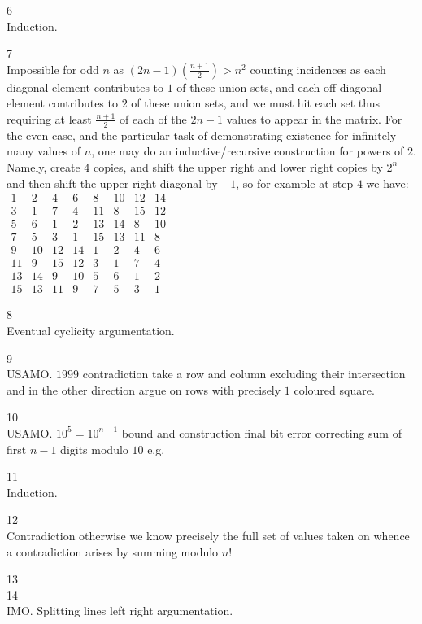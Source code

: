 6 \\
Induction.

7 \\
Impossible for odd $n$ as $(2n-1)\left(\frac{n+1}{2}\right) > n^2$ counting incidences as each diagonal element contributes to $1$ of these union sets, and each off-diagonal element contributes to $2$ of these union sets, and we must hit each set thus requiring at least $\frac{n+1}{2}$ of each of the $2n-1$ values to appear in the matrix. For the even case, and the particular task of demonstrating existence for infinitely many values of $n$, one may do an inductive/recursive construction for powers of $2$. Namely, create $4$ copies, and shift the upper right and lower right copies by $2^{n}$ and then shift the upper right diagonal by $-1$, so for example at step $4$ we have: \\
$
\begin{matrix}
1 & 2 & 4 & 6 & 8 & 10 & 12 & 14 \\
3 & 1 & 7 & 4 & 11 & 8 & 15 & 12 \\
5 & 6 & 1 & 2 & 13 & 14 & 8 & 10 \\
7 & 5 & 3 & 1 & 15 & 13 & 11 & 8 \\
9 & 10 & 12 & 14 & 1 & 2 & 4 & 6 \\
11 & 9 & 15 & 12 & 3 & 1 & 7 & 4 \\
13 & 14 & 9 & 10 & 5 & 6 & 1 & 2 \\
15 & 13 & 11 & 9 & 7 & 5 & 3 & 1
\end{matrix}
$

8 \\
Eventual cyclicity argumentation.

9 \\
USAMO. $\boxed{1999}$ contradiction take a row and column excluding their intersection and in the other direction argue on rows with precisely $1$ coloured square.

10 \\
USAMO. $\boxed{10^5}=10^{n-1}$ bound and construction final bit error correcting sum of first $n-1$ digits modulo $10$ e.g.

11 \\
Induction.

12 \\
Contradiction otherwise we know precisely the full set of values taken on whence a contradiction arises by summing modulo $n!$

13 \\


14 \\
IMO. Splitting lines left right argumentation.

